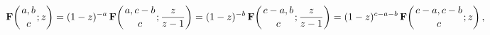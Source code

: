 \[\mathop{\mathbf{F}\/}\nolimits\!\left({a,b\atop c};z\right)=(1-z)^{-a}\mathop{%
\mathbf{F}\/}\nolimits\!\left({a,c-b\atop c};\frac{z}{z-1}\right)=(1-z)^{-b}%
\mathop{\mathbf{F}\/}\nolimits\!\left({c-a,b\atop c};\frac{z}{z-1}\right)=(1-z%
)^{c-a-b}\mathop{\mathbf{F}\/}\nolimits\!\left({c-a,c-b\atop c};z\right),\]